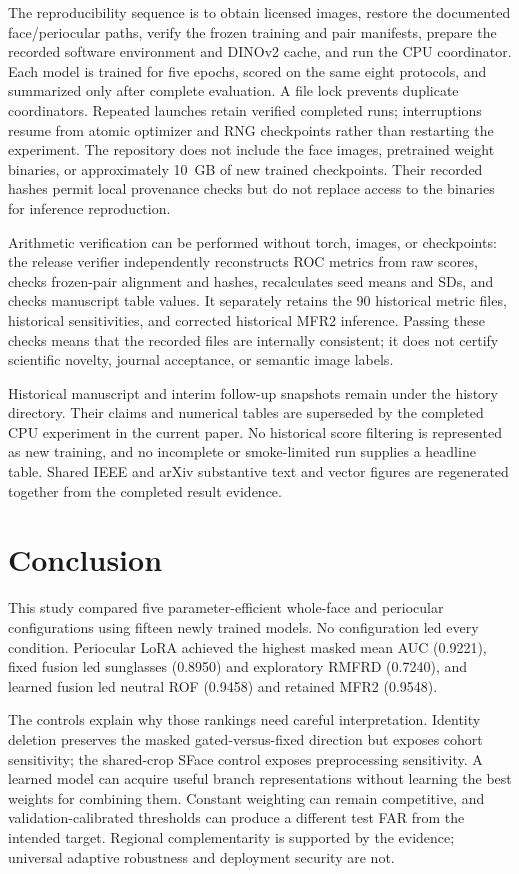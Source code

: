 \documentclass[10pt,journal,compsoc]{IEEEtran}
\begin{document}
The reproducibility sequence is to obtain licensed images, restore the documented face/periocular paths, verify the frozen training and pair manifests, prepare the recorded software environment and DINOv2 cache, and run the CPU coordinator. Each model is trained for five epochs, scored on the same eight protocols, and summarized only after complete evaluation. A file lock prevents duplicate coordinators. Repeated launches retain verified completed runs; interruptions resume from atomic optimizer and RNG checkpoints rather than restarting the experiment. The repository does not include the face images, pretrained weight binaries, or approximately 10~GB of new trained checkpoints. Their recorded hashes permit local provenance checks but do not replace access to the binaries for inference reproduction.

Arithmetic verification can be performed without torch, images, or checkpoints: the release verifier independently reconstructs ROC metrics from raw scores, checks frozen-pair alignment and hashes, recalculates seed means and SDs, and checks manuscript table values. It separately retains the 90 historical metric files, historical sensitivities, and corrected historical MFR2 inference. Passing these checks means that the recorded files are internally consistent; it does not certify scientific novelty, journal acceptance, or semantic image labels.

Historical manuscript and interim follow-up snapshots remain under the history directory. Their claims and numerical tables are superseded by the completed CPU experiment in the current paper. No historical score filtering is represented as new training, and no incomplete or smoke-limited run supplies a headline table. Shared IEEE and arXiv substantive text and vector figures are regenerated together from the completed result evidence.

\section{Conclusion}
This study compared five parameter-efficient whole-face and periocular configurations using fifteen newly trained models. No configuration led every condition. Periocular LoRA achieved the highest masked mean AUC (0.9221), fixed fusion led sunglasses (0.8950) and exploratory RMFRD (0.7240), and learned fusion led neutral ROF (0.9458) and retained MFR2 (0.9548).

The controls explain why those rankings need careful interpretation. Identity deletion preserves the masked gated-versus-fixed direction but exposes cohort sensitivity; the shared-crop SFace control exposes preprocessing sensitivity. A learned model can acquire useful branch representations without learning the best weights for combining them. Constant weighting can remain competitive, and validation-calibrated thresholds can produce a different test FAR from the intended target. Regional complementarity is supported by the evidence; universal adaptive robustness and deployment security are not.
\end{document}
